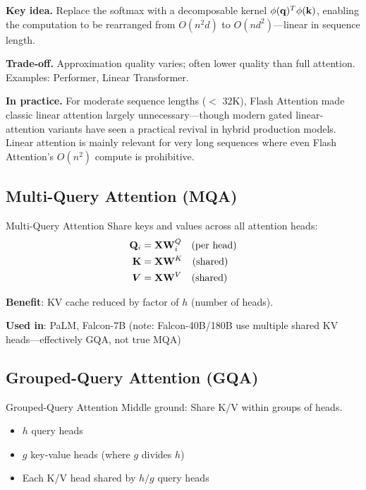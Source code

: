 \textbf{Key idea.} Replace the softmax with a decomposable kernel $\phi(\mathbf{q})^T \phi(\mathbf{k})$, enabling the computation to be rearranged from $O(n^2 d)$ to $O(n d^2)$---linear in sequence length.

\textbf{Trade-off.} Approximation quality varies; often lower quality than full attention. Examples: Performer, Linear Transformer.

\textbf{In practice.} For moderate sequence lengths ($<$ 32K), Flash Attention made classic linear attention largely unnecessary---though modern gated linear-attention variants have seen a practical revival in hybrid production models. Linear attention is mainly relevant for very long sequences where even Flash Attention's $O(n^2)$ compute is prohibitive.

\subsection{Multi-Query Attention (MQA)}

\begin{mathresult}{Multi-Query Attention}
Share keys and values across all attention heads:
\begin{align}
\mathbf{Q}_i &= \mathbf{X} \mathbf{W}_i^Q \quad \text{(per head)} \\
\mathbf{K} &= \mathbf{X} \mathbf{W}^K \quad \text{(shared)} \\
\bm{V} &= \mathbf{X} \mathbf{W}^V \quad \text{(shared)}
\end{align}
\end{mathresult}

\textbf{Benefit}: KV cache reduced by factor of $h$ (number of heads).

\textbf{Used in}: PaLM, Falcon-7B (note: Falcon-40B/180B use multiple shared KV heads---effectively GQA, not true MQA)

\subsection{Grouped-Query Attention (GQA)}

\begin{mathresult}{Grouped-Query Attention}
Middle ground: Share K/V within groups of heads.
\begin{itemize}
    \item $h$ query heads
    \item $g$ key-value heads (where $g$ divides $h$)
    \item Each K/V head shared by $h/g$ query heads
\end{itemize}
\end{mathresult}

